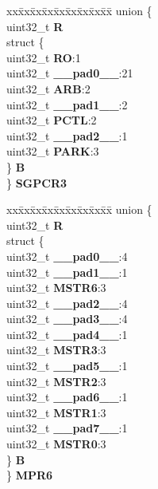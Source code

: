 \begin{DoxyCompactItemize}
\begin{tabbing}
\end{tabbing}\item 
\mbox{\label{structXBAR__tag_ad6eb74ed9fd64e823071cf561fbbca89}} 
\begin{tabbing}
xx\=xx\=xx\=xx\=xx\=xx\=xx\=xx\=xx\=\kill
union \{\\
\>uint32\_t {\bfseries R}\\
\>struct \{\\
\>\>uint32\_t {\bfseries RO}:1\\
\>\>uint32\_t {\bfseries \_\_pad0\_\_}:21\\
\>\>uint32\_t {\bfseries ARB}:2\\
\>\>uint32\_t {\bfseries \_\_pad1\_\_}:2\\
\>\>uint32\_t {\bfseries PCTL}:2\\
\>\>uint32\_t {\bfseries \_\_pad2\_\_}:1\\
\>\>uint32\_t {\bfseries PARK}:3\\
\>\} {\bfseries B}\\
\} {\bfseries SGPCR3}\\

\end{tabbing}\item 
\mbox{\label{structXBAR__tag_a4d2009aa564073240909bd023068af55}} 
\begin{tabbing}
xx\=xx\=xx\=xx\=xx\=xx\=xx\=xx\=xx\=\kill
union \{\\
\>uint32\_t {\bfseries R}\\
\>struct \{\\
\>\>uint32\_t {\bfseries \_\_pad0\_\_}:4\\
\>\>uint32\_t {\bfseries \_\_pad1\_\_}:1\\
\>\>uint32\_t {\bfseries MSTR6}:3\\
\>\>uint32\_t {\bfseries \_\_pad2\_\_}:4\\
\>\>uint32\_t {\bfseries \_\_pad3\_\_}:4\\
\>\>uint32\_t {\bfseries \_\_pad4\_\_}:1\\
\>\>uint32\_t {\bfseries MSTR3}:3\\
\>\>uint32\_t {\bfseries \_\_pad5\_\_}:1\\
\>\>uint32\_t {\bfseries MSTR2}:3\\
\>\>uint32\_t {\bfseries \_\_pad6\_\_}:1\\
\>\>uint32\_t {\bfseries MSTR1}:3\\
\>\>uint32\_t {\bfseries \_\_pad7\_\_}:1\\
\>\>uint32\_t {\bfseries MSTR0}:3\\
\>\} {\bfseries B}\\
\} {\bfseries MPR6}\\


\end{tabbing}
\end{DoxyCompactItemize}
